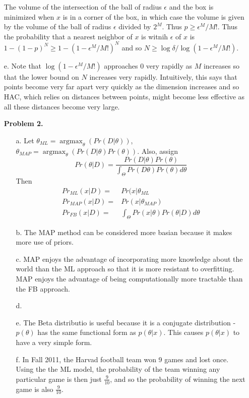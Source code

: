 \documentclass[12pt]{amsart}
\DeclareMathOperator{\argmax}{argmax}
\theoremstyle{remark}
\begin{document}
\begin{enumerate}
The volume of the intersection of the ball of radius $\epsilon$ and the box is minimized when $x$ is in a corner of the box, in which case the volume is given by the volume of the ball of radius $\epsilon$ divided by $2^M$. Thus $p \ge \epsilon^M/M!$. Thus the probability that a nearest neighbor of $x$ is witnih $\epsilon$ of $x$ is $1-(1-p)^N\ge 1-(1-\epsilon^M/M!)^N$ and so $N\ge \log \delta/\log(1-\epsilon^M/M!)$.

\item[e.]
Note that $\log(1-\epsilon^M/M!)$ approaches 0 very rapidly as $M$ increases so that the lower bound on $N$ increases very rapidly. Intuitively, this says that points become very far apart very quickly as the dimension increases and so HAC, which relies on distances between points, might become less effective as all these distances become very large.


\noindent \textbf{Problem 2.}

\begin{enumerate}
\item[a.]
Let $\theta_{ML} = \argmax_{\theta}(Pr(D|\theta))$, $\theta_{MAP}=\argmax_{\theta}(Pr(D|\theta)Pr(\theta))$. Also, assign
\[
Pr(\theta|D) = \frac{Pr(D|\theta)Pr(\theta)}{\int_{\Theta} Pr(D\theta)Pr(\theta)d\theta}
\]
Then
\begin{align*}
Pr_{ML}(x|D) =& Pr(x|\theta_{ML}\\
Pr_{MAP}(x|D) = & Pr(x|\theta_{MAP})\\
Pr_{FB}(x|D) = & \int_{\Theta} Pr(x|\theta)Pr(\theta|D) d\theta
\end{align*}


\item[b.]
The MAP method can be considered more basian because it makes more use of priors.

\item[c.]
MAP enjoys the advantage of incorporating more knowledge about the world than the ML approach so that it is more resistant to overfitting. MAP enjoys the advantage of being computationally more tractable than the FB approach.

\item[d.]

\item[e.]
The Beta distributio is useful because it is a conjugate distribution - $p(\theta)$ has the same functional form as $p(\theta|x)$. This causes $p(\theta|x)$ to have a very simple form.

\item[f.]
In Fall 2011, the Harvad football team won 9 games and lost once. Using the the ML model, the probability of the team winning any particular game is then just $\frac{9}{10}$, and so the probability of winning the next game is also $\frac{9}{10}$.


\end{enumerate}
\end{enumerate}
\end{document}
